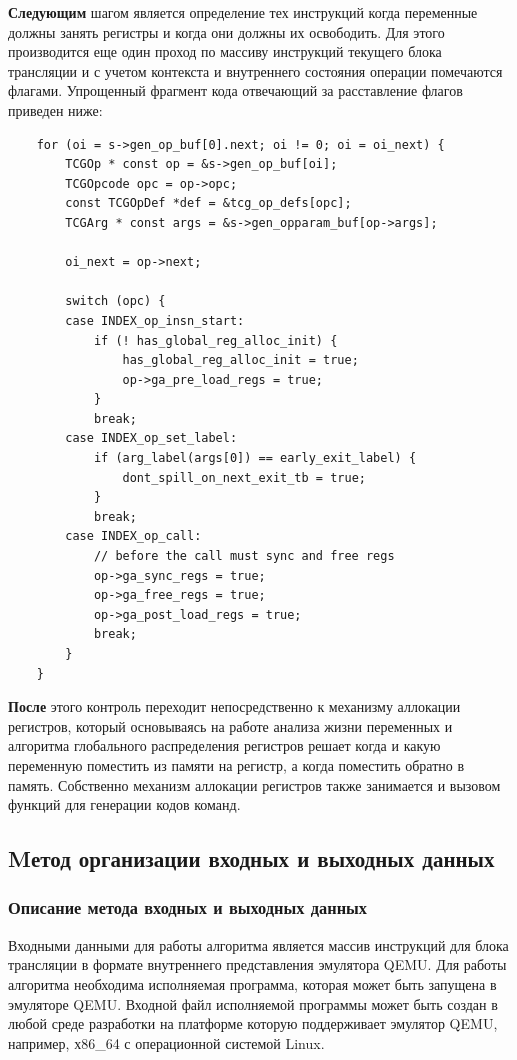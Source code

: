 \textbf{Следующим}
шагом  является определение тех инструкций когда переменные должны занять регистры и когда они должны их освободить. Для этого производится еще один проход по массиву инструкций текущего блока трансляции и с учетом контекста и внутреннего состояния операции помечаются флагами. Упрощенный фрагмент кода отвечающий за расставление флагов приведен ниже:

\begin{small}
\begin{verbatim}
    for (oi = s->gen_op_buf[0].next; oi != 0; oi = oi_next) {
        TCGOp * const op = &s->gen_op_buf[oi];
        TCGOpcode opc = op->opc;
        const TCGOpDef *def = &tcg_op_defs[opc];
        TCGArg * const args = &s->gen_opparam_buf[op->args];

        oi_next = op->next;

        switch (opc) {
        case INDEX_op_insn_start:
            if (! has_global_reg_alloc_init) {
                has_global_reg_alloc_init = true;
                op->ga_pre_load_regs = true;
            }
            break;
        case INDEX_op_set_label:
            if (arg_label(args[0]) == early_exit_label) {
                dont_spill_on_next_exit_tb = true;
            }
            break;
        case INDEX_op_call:
            // before the call must sync and free regs
            op->ga_sync_regs = true;
            op->ga_free_regs = true;
            op->ga_post_load_regs = true;
            break;
        }
    }
\end{verbatim}
\end{small}

\textbf{После}
этого контроль переходит непосредственно к механизму аллокации регистров, который основываясь на работе анализа жизни переменных и алгоритма глобального распределения регистров решает когда и какую переменную поместить из памяти на регистр, а когда поместить обратно в память. Собственно механизм аллокации регистров также занимается и  вызовом функций для генерации кодов команд.


\subsection{Mетод организации входных и выходных данных}

\subsubsection{Описание метода входных и выходных данных}
Входными данными для работы алгоритма является массив инструкций для блока трансляции в формате внутреннего представления эмулятора QEMU. Для работы алгоритма необходима исполняемая программа, которая может быть запущена в эмуляторе QEMU. Входной файл исполняемой программы может быть создан в любой среде разработки на платформе которую поддерживает эмулятор QEMU, например, х86\_64 с операционной системой Linux.

